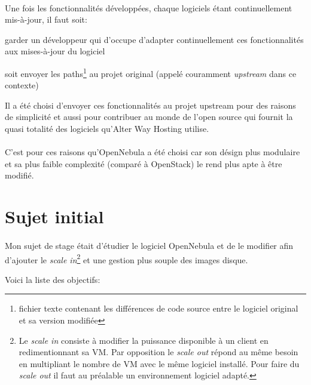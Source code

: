 \paragraph*{}
Une fois les fonctionnalités développées, chaque logiciels étant continuellement mis-à-jour, il faut soit:
\begin{listi}
	\item garder un développeur qui d'occupe d'adapter continuellement ces fonctionnalités aux mises-à-jour du logiciel
	\item soit envoyer les paths\footnote{fichier texte contenant les différences de code source entre le logiciel original et sa version modifiée}
		au projet original (appelé couramment \emph{upstream} dans ce contexte)
\end{listi}

Il a été choisi d'envoyer ces fonctionnalités au projet upstream pour des raisons de simplicité et aussi pour contribuer au monde de
l'open source qui fournit la quasi totalité des logiciels qu'Alter Way Hosting utilise.

\paragraph*{}
C'est pour ces raisons qu'OpenNebula a été choisi car son désign plus modulaire et sa plus faible complexité (comparé à OpenStack) le rend
plus apte à être modifié.

\section{Sujet initial}
\paragraph*{}
Mon sujet de stage était d'étudier le logiciel OpenNebula et de le modifier afin d'ajouter le \emph{scale in}\footnote{Le \emph{scale in} consiste à
modifier la puissance disponible à un client en redimentionnant sa VM. Par opposition le \emph{scale out} répond au même besoin en multipliant le nombre de VM avec le même logiciel
installé. Pour faire du \emph{scale out} il faut au préalable un environnement logiciel adapté.} et une gestion plus souple des images disque.

Voici la liste des objectifs:

